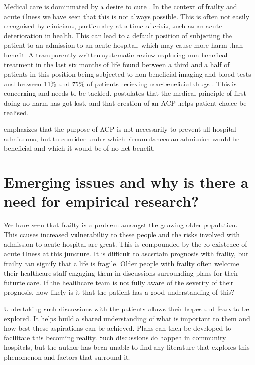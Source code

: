 \documentclass
[
	12pt,
	a4paper,
	oneside,
]{report}
\begin{document}
Medical care is dominmated by a desire to cure \parencite{taylor:17}. In the 
context of frailty and acute illness we have seen that this is not always 
possible. This is often not easily recognised by clinicians, particulalry
at a time of crisis, such as an acute deterioration in health. This can lead
to a default position of subjecting the patient to an admission to an acute
hospital, which may cause more harm than benefit. A transparently written 
systematic review exploring non-benefical treatment in the last six months
of life found between a third and a half of patients in this position being
subjected to non-beneficial imaging and blood tests and between 11\% and
75\% of patients recieving non-beneficial drugs \parencite{cardona:16}.
This is concerning and needs to be tackled. \textcite{taylor:17} postulates
that the medical principle of first doing no harm has got lost, and that
creation of an ACP helps patient choice be realised.

\textcite{waird:16} emphasizes that the purpose of ACP is not necessarily
to prevent all hospital admissions, but to consider under which 
circumstances an admission would be beneficial and which it would be of
no net benefit.

\section{Emerging issues and why is there a need for empirical 
research?}

We have seen that frailty is a problem amongst the growing older population.
This causes increased vulnerabiltiy to these people and the risks involved with 
admission to acute hospital are great. This is compounded by the co-existence
of acute illness at this juncture. It is difficult to ascertain prognosis with 
frailty, but frailty can signify that a life is fragile. Older people with 
frailty often welcome their healthcare staff engaging them in discussions 
surrounding plans for their futurte care. If the healthcare team is not fully
aware of the severity of their prognosis, how likely is it that the patient
has a good understanding of this? 

Undertaking such discussions with the patients allows their hopes and fears to
be explored. It helps build a shared understanding of what is important to
them and how best these aspirations can be achieved. Plans can then be 
developed to facilitate this becoming reality. Such discussions do happen in
community hospitals, but the author has been unable to find any literature
that explores this phenomenon and factors that surround it.
\end{document}
